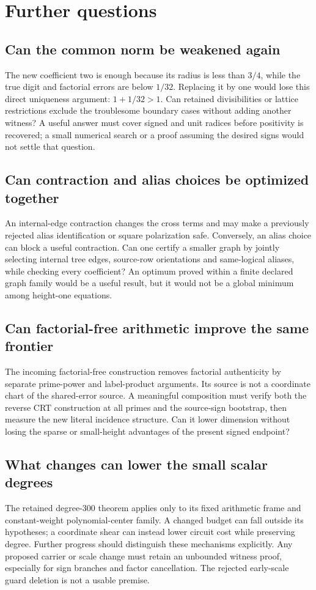 \section{Further questions}
\subsection{Can the common norm be weakened again}
The new coefficient two is enough because its radius is less than
$3/4$, while the true digit and factorial errors are below $1/32$.
Replacing it by one would lose this direct uniqueness argument:
$1+1/32>1$. Can retained divisibilities or lattice restrictions exclude
the troublesome boundary cases without adding another witness? A useful
answer must cover signed and unit radices before positivity is recovered;
a small numerical search or a proof assuming the desired signs would not
settle that question.

\subsection{Can contraction and alias choices be optimized together}
An internal-edge contraction changes the cross terms and may make a
previously rejected alias identification or square polarization safe.
Conversely, an alias choice can block a useful contraction. Can one certify
a smaller graph by jointly selecting internal tree edges, source-row
orientations and same-logical aliases, while checking every coefficient?
An optimum proved within a finite declared graph family would be a useful
result, but it would not be a global minimum among height-one equations.

\subsection{Can factorial-free arithmetic improve the same frontier}
The incoming factorial-free construction removes factorial authenticity
by separate prime-power and label-product arguments. Its source is not a
coordinate chart of the shared-error source. A meaningful composition
must verify both the reverse CRT construction at all primes and the
source-sign bootstrap, then measure the new literal incidence structure.
Can it lower dimension without losing the sparse or small-height
advantages of the present signed endpoint?

\subsection{What changes can lower the small scalar degrees}
The retained degree-300 theorem applies only to its fixed arithmetic
frame and constant-weight polynomial-center family. A changed budget
can fall outside its hypotheses; a coordinate shear can instead lower
circuit cost while preserving degree. Further progress should distinguish
these mechanisms explicitly. Any proposed carrier or scale change must
retain an unbounded witness proof, especially for sign branches and
factor cancellation. The rejected early-scale guard deletion is not a
usable premise.

